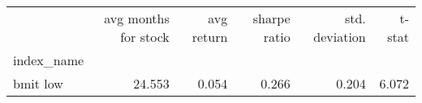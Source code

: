 \begin{tabular}{lrrrrr}
\toprule
{} &  avg months for stock &  avg return &  sharpe ratio &  std. deviation &  t-stat \\
index\_name &                       &             &               &                 &         \\
\midrule
bmit low   &                24.553 &       0.054 &         0.266 &           0.204 &   6.072 \\
\bottomrule
\end{tabular}
